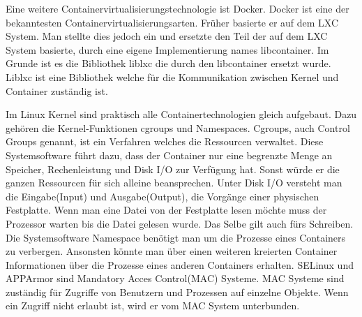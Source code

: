 \documentclass[10pt]{article}
\begin{document}
Eine weitere Containervirtualisierungstechnologie ist Docker. Docker ist eine der bekanntesten Containervirtualisierungsarten. Früher basierte er auf dem LXC System. Man stellte dies jedoch ein und ersetzte den Teil der auf dem LXC System basierte, durch eine eigene Implementierung names libcontainer. Im Grunde ist es die Bibliothek liblxc die durch den libcontainer ersetzt wurde.\cite{container} Liblxc ist eine Bibliothek welche für die Kommunikation zwischen Kernel und Container zuständig ist.\cite{liblxc} 

Im Linux Kernel sind praktisch alle Containertechnologien gleich aufgebaut. Dazu gehören die Kernel-Funktionen cgroups und Namespaces. Cgroups, auch Control Groups genannt, ist ein Verfahren welches die Ressourcen verwaltet. Diese Systemsoftware führt dazu, dass der Container nur eine begrenzte Menge an Speicher, Rechenleistung und Disk I/O zur Verfügung hat. Sonst würde er die ganzen Ressourcen für sich alleine beansprechen. Unter Disk I/O versteht man die Eingabe(Input) und Ausgabe(Output), die Vorgänge einer physischen Festplatte. Wenn man eine Datei von der Festplatte lesen möchte muss der Prozessor warten bis die Datei gelesen wurde. Das Selbe gilt auch fürs Schreiben. \cite{diskIO} Die Systemsoftware Namespace benötigt man um die Prozesse eines Containers zu verbergen. Ansonsten könnte man über einen weiteren kreierten Container Informationen über die Prozesse eines anderen Containers erhalten.\cite{cgroupsNamespace} SELinux und APPArmor sind Mandatory Acces Control(MAC) Systeme. MAC Systeme sind zuständig für Zugriffe von Benutzern und Prozessen auf einzelne Objekte. Wenn ein Zugriff nicht erlaubt ist, wird er vom MAC System unterbunden.\cite{MAC} 

\pagebreak
\end{document}

